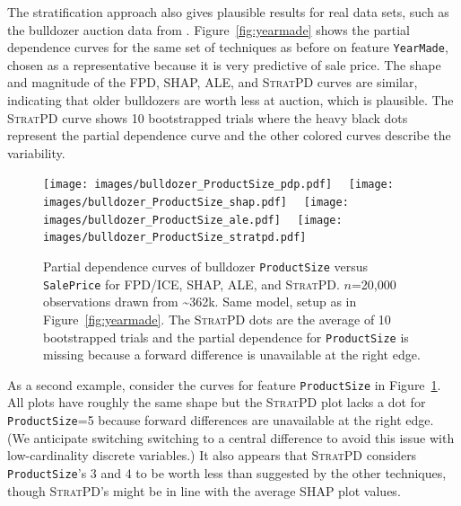 \documentclass[]{article} %
\newcommand{\figref}[1]{Figure~\ref{#1}}
\newcommand{\spd}{\fontfamily{cmr}\textsc{\small StratPD}}
\begin{document}
The stratification approach also gives plausible results for real data sets, such as the bulldozer auction data from \citet{bulldozer}. \figref{fig:yearmade} shows the partial dependence curves for the same set of techniques as before on feature {\tt\small YearMade}, chosen as a representative because it is very predictive of sale price. The shape and magnitude of the FPD, SHAP, ALE, and \spd{} curves are similar, indicating that older bulldozers are worth less at auction, which is plausible. The \spd{} curve shows 10 bootstrapped trials where the heavy black dots represent the partial dependence curve and the other colored curves describe the variability. 

\begin{figure}[!htbp]
\begin{center}
\texttt{[image: images/bulldozer\_ProductSize\_pdp.pdf]}~~
\texttt{[image: images/bulldozer\_ProductSize\_shap.pdf]}~~
\texttt{[image: images/bulldozer\_ProductSize\_ale.pdf]}~~
\texttt{[image: images/bulldozer\_ProductSize\_stratpd.pdf]}
\caption{\small Partial dependence curves of bulldozer {\tt ProductSize} versus {\tt SalePrice} for FPD/ICE, SHAP, ALE, and \spd. $n$=20,000 observations drawn from \textasciitilde{}362k. Same model, setup as in \figref{fig:yearmade}.  The \spd{} dots are the average of 10 bootstrapped trials and the partial dependence for {\tt ProductSize} is missing because a forward difference is unavailable at the right edge.}
\label{fig:ProductSize}
\end{center}
\end{figure}

As a second example, consider the curves for feature {\tt\small ProductSize} in \figref{fig:ProductSize}. All plots have roughly the same shape but the \spd{} plot lacks a dot for {\tt\small ProductSize}=5 because  forward differences are unavailable at the right edge.  (We anticipate switching switching to a central difference to avoid this issue with low-cardinality discrete variables.) It also appears that \spd{}  considers {\tt\small ProductSize}'s 3 and 4 to be worth less than suggested by the other techniques, though \spd{}'s might be in line with the average SHAP plot values.
\end{document}
